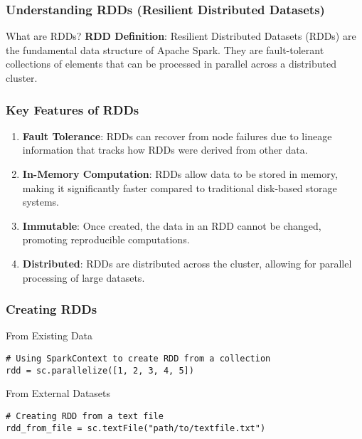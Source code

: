\documentclass[aspectratio=169]{beamer}
\begin{document}
\begin{frame}[fragile]
    \frametitle{Understanding RDDs (Resilient Distributed Datasets)}
    \begin{block}{What are RDDs?}
        \textbf{RDD Definition}: Resilient Distributed Datasets (RDDs) are the fundamental data structure of Apache Spark. They are fault-tolerant collections of elements that can be processed in parallel across a distributed cluster.
    \end{block}
\end{frame}

\begin{frame}[fragile]
    \frametitle{Key Features of RDDs}
    \begin{enumerate}
        \item \textbf{Fault Tolerance}: RDDs can recover from node failures due to lineage information that tracks how RDDs were derived from other data.
        \item \textbf{In-Memory Computation}: RDDs allow data to be stored in memory, making it significantly faster compared to traditional disk-based storage systems.
        \item \textbf{Immutable}: Once created, the data in an RDD cannot be changed, promoting reproducible computations.
        \item \textbf{Distributed}: RDDs are distributed across the cluster, allowing for parallel processing of large datasets.
    \end{enumerate}
\end{frame}

\begin{frame}[fragile]
    \frametitle{Creating RDDs}
    \begin{block}{From Existing Data}
        \begin{lstlisting}
# Using SparkContext to create RDD from a collection
rdd = sc.parallelize([1, 2, 3, 4, 5])
        \end{lstlisting}
    \end{block}
    
    \begin{block}{From External Datasets}
        \begin{lstlisting}
# Creating RDD from a text file
rdd_from_file = sc.textFile("path/to/textfile.txt")
        \end{lstlisting}
    \end{block}
\end{frame}
\end{document}
